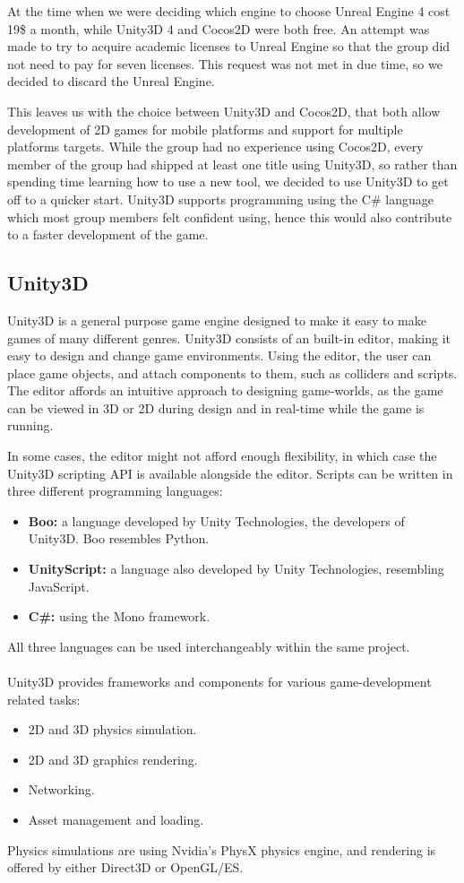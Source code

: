 At the time when we were deciding which engine to choose Unreal Engine 4 cost 19\$ a month\cite{unrealFree}, while Unity3D 4 and Cocos2D were both free. 
An attempt was made to try to acquire academic licenses to Unreal Engine so that the group did not need to pay for seven licenses. 
This request was not met in due time, so we decided to discard the Unreal Engine.

This leaves us with the choice between Unity3D and Cocos2D, that both allow development of 2D games for mobile platforms and support for multiple platforms targets.
While the group had no experience using Cocos2D, every member of the group had shipped at least one title using Unity3D, so rather than spending time learning how to use a new tool, we decided to use Unity3D to get off to a quicker start.
Unity3D supports programming using the C\# language which most group members felt confident using, hence this would also contribute to a faster development of the game.

\subsection{Unity3D}
Unity3D is a general purpose game engine designed to make it easy to make games
of many different genres. Unity3D consists of an built-in editor, making it
easy to design and change game environments. Using the editor, the user can
place game objects, and attach components to them, such as colliders and
scripts. The editor affords an intuitive approach to designing game-worlds, as
the game can be viewed in 3D or 2D during design and in real-time while the
game is running.

In some cases, the editor might not afford enough flexibility, in which case
the Unity3D scripting API is available alongside the editor.
Scripts can be written in three different programming languages:

\begin{itemize}
    \item \textbf{Boo:} a language developed by Unity Technologies, the
        developers of Unity3D. Boo resembles Python.
    \item \textbf{UnityScript:} a language also developed by Unity
        Technologies, resembling JavaScript.
    \item \textbf{C\#:} using the Mono framework.
\end{itemize}

All three languages can be used interchangeably within the same project.
\\
\\
Unity3D provides frameworks and components for various game-development related
tasks:
\begin{itemize}
    \item 2D and 3D physics simulation.
    \item 2D and 3D graphics rendering.
    \item Networking.
    \item Asset management and loading.
\end{itemize}

Physics simulations are using Nvidia's PhysX physics engine, and rendering is
offered by either Direct3D or OpenGL/ES.



